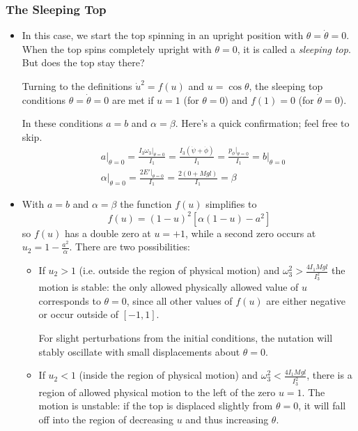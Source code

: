 \documentclass[11pt, a4paper]{article}
\begin{document}
\subsubsection{The Sleeping Top}

\begin{itemize}
	\item In this case, we start the top spinning in an upright position with $ \theta = \dot{\theta} = 0 $. When the top spins completely upright with $ \theta = 0 $, it is called a \textit{sleeping top}. But does the top stay there?
	
	Turning to the definitions $ \dot{u}^{2} = f(u) $ and $ u = \cos \theta $, the sleeping top conditions $ \theta = \dot{\theta} = 0 $ are met if $ u = 1 $ (for $ \theta = 0 $) and $ f(1) = 0 $ (for $ \dot{\theta} = 0 $).
	
	In these conditions $ a = b $ and $ \alpha = \beta $. Here's a quick confirmation; feel free to skip.
	\begin{align*}
		&a \big|_{\theta = 0} = \frac{I_{3}\omega_{3}\big|_{\theta = 0}}{I_{1}} = \frac{I_{3}(\dot{\psi} + \dot{\phi})}{I_{1}} = \frac{p_{\phi}\big|_{\theta = 0}}{I_{1}} = b \big|_{\theta = 0} \\
		&\alpha\big|_{\theta = 0} = \frac{2E' \big|_{\theta=0}}{I_{1}} = \frac{2(0 + Mgl)}{I_{1}} = \beta
	\end{align*}
	
	\item With $ a = b $ and $ \alpha = \beta $ the function $ f(u) $ simplifies to
	\begin{equation*}
		f(u) = (1-u)^{2}\left[\alpha(1-u)-a^{2}\right]
	\end{equation*}
	so $ f(u) $ has a double zero at $ u = + 1 $, while a second zero occurs at $ u_{2} = 1 - \frac{a^{2}}{\alpha} $. There are two possibilities:
	\begin{itemize}
		\item If $ u_{2} > 1 $ (i.e. outside the region of physical motion) and $ \omega_{3}^{2} > \frac{4I_{1}Mgl}{I_{3}^{2}} $ the motion is stable: the only allowed physically allowed value of $ u $ corresponds to $ \theta = 0 $, since all other values of $ f(u) $ are either negative or occur outside of $ [-1, 1] $.
		
		For slight perturbations from the initial conditions, the nutation will stably oscillate with small displacements about $ \theta = 0 $. 
		
		\item If $ u_{2} < 1 $ (inside the region of physical motion) and $ \omega_{3}^{2} < \frac{4I_{1}Mgl}{I_{3}^{2}} $, there is a region of allowed physical motion to the left of the zero $ u = 1 $. The motion is unstable: if the top is displaced slightly from $ \theta = 0 $, it will fall off into the region of decreasing $ u $ and thus increasing $ \theta $.
		

\end{itemize}
\end{itemize}
\end{document}
